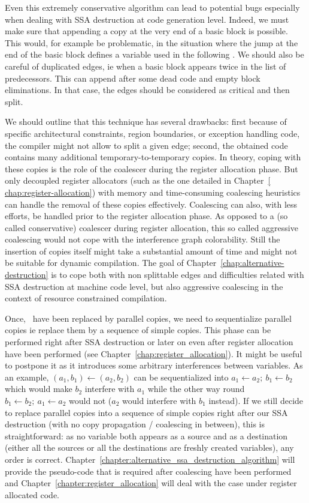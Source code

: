 Even this extremely conservative algorithm can lead to potential bugs especially when dealing with SSA destruction at code generation level. Indeed, we must make sure that appending a copy at the very end of a basic block is possible. This would, for example be problematic, in the situation where the jump at the end of the basic block defines a variable used in the following \phiop. We should also be careful of duplicated edges, ie when a basic block appears twice in the list of predecessors. This can append after some dead code and empty block eliminations. In that case, the edges should be considered as critical and then split.

We should outline that this technique has several drawbacks: first because of specific architectural constraints, region boundaries, or exception handling code, the compiler might not allow to split a given edge; second, the obtained code contains many additional temporary-to-temporary copies. In theory, coping with these copies is the role of the coalescer during the register allocation phase. But only decoupled register allocators (such as the one detailed in Chapter~\ref{ chap:register-allocation}) with memory and time-consuming coalescing heuristics can handle the removal of these copies effectively. Coalescing can also, with less efforts, be handled prior to the register allocation phase. As opposed to a (so called conservative) coalescer during register allocation, this so called aggressive coalescing would not cope with the interference graph colorability. Still the insertion of copies itself might take a substantial amount of time and might not be suitable for dynamic compilation. The goal of Chapter~\ref{chap:alternative-destruction} is to cope both with non splittable edges and difficulties related with SSA destruction at machine code level, but also aggressive coalescing in the context of resource constrained compilation.

Once, \phiops\ have been replaced by parallel copies, we need to sequentialize parallel copies ie replace them by a sequence of simple copies. This phase can be performed right after SSA destruction or later on even after register allocation have been performed (see Chapter~\ref{chap:register_allocation}). It might be useful to postpone it as it introduces some arbitrary interferences between variables. As an example, $(a_1,b_1)\gets (a_2,b_2)$ can be sequentialized into $a_1\gets a_2;\ b_1\gets b_2$ which would make $b_2$ interfere with $a_1$ while the other way round $b_1\gets b_2;\ a_1\gets a_2$ would not ($a_2$ would interfere with $b_1$ instead).
If we still decide to replace parallel copies into a sequence of simple copies right after our SSA destruction (with no copy propagation / coalescing in between), this is straightforward: as no variable both appears as a source and as a destination (either all the sources or all the destinations are freshly created variables), any order is correct. Chapter~\ref{chapter:alternative_ssa_destruction_algorithm} will provide the pseudo-code that is required after coalescing have been performed and Chapter~\ref{chapter:register_allocation} will deal with the case under register allocated code.

